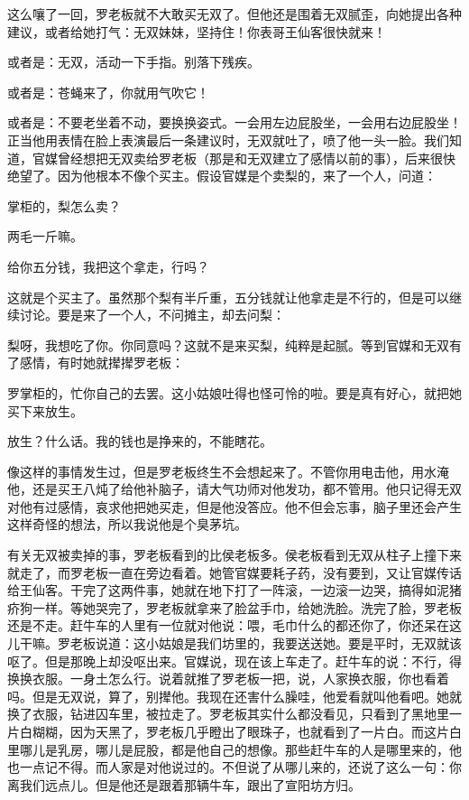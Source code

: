 这么嚷了一回，罗老板就不大敢买无双了。但他还是围着无双腻歪，向她提出各种建议，或者给她打气：无双妹妹，坚持住！你表哥王仙客很快就来！ 

或者是：无双，活动一下手指。别落下残疾。 

或者是：苍蝇来了，你就用气吹它！ 

或者是：不要老坐着不动，要换换姿式。一会用左边屁股坐，一会用右边屁股坐！正当他用表情在脸上表演最后一条建议时，无双就吐了，喷了他一头一脸。我们知道，官媒曾经想把无双卖给罗老板（那是和无双建立了感情以前的事），后来很快绝望了。因为他根本不像个买主。假设官媒是个卖梨的，来了一个人，问道： 

掌柜的，梨怎么卖？ 

两毛一斤嘛。 

给你五分钱，我把这个拿走，行吗？ 

这就是个买主了。虽然那个梨有半斤重，五分钱就让他拿走是不行的，但是可以继续讨论。要是来了一个人，不问摊主，却去问梨： 

梨呀，我想吃了你。你同意吗？这就不是来买梨，纯粹是起腻。等到官媒和无双有了感情，有时她就撵撵罗老板： 

罗掌柜的，忙你自己的去罢。这小姑娘吐得也怪可怜的啦。要是真有好心，就把她买下来放生。 

放生？什么话。我的钱也是挣来的，不能瞎花。 

像这样的事情发生过，但是罗老板终生不会想起来了。不管你用电击他，用水淹他，还是买王八炖了给他补脑子，请大气功师对他发功，都不管用。他只记得无双对他有过感情，哀求他把她买走，但是他没答应。他不但会忘事，脑子里还会产生这样奇怪的想法，所以我说他是个臭茅坑。 

有关无双被卖掉的事，罗老板看到的比侯老板多。侯老板看到无双从柱子上撞下来就走了，而罗老板一直在旁边看着。她管官媒要耗子药，没有要到，又让官媒传话给王仙客。干完了这两件事，她就在地下打了一阵滚，一边滚一边哭，搞得如泥猪疥狗一样。等她哭完了，罗老板就拿来了脸盆手巾，给她洗脸。洗完了脸，罗老板还是不走。赶牛车的人里有一位就对他说：喂，毛巾什么的都还你了，你还呆在这儿干嘛。罗老板说道：这小姑娘是我们坊里的，我要送送她。要是平时，无双就该呕了。但是那晚上却没呕出来。官媒说，现在该上车走了。赶牛车的说：不行，得换换衣服。一身土怎么行。说着就推了罗老板一把，说，人家换衣服，你也看着吗。但是无双说，算了，别撵他。我现在还害什么臊哇，他爱看就叫他看吧。她就换了衣服，钻进囚车里，被拉走了。罗老板其实什么都没看见，只看到了黑地里一片白糊糊，因为天黑了，罗老板几乎瞪出了眼珠子，也就看到了一片白。而这片白里哪儿是乳房，哪儿是屁股，都是他自己的想像。那些赶牛车的人是哪里来的，他也一点记不得。而人家是对他说过的。不但说了从哪儿来的，还说了这么一句：你离我们远点儿。但是他还是跟着那辆牛车，跟出了宣阳坊方归。 

